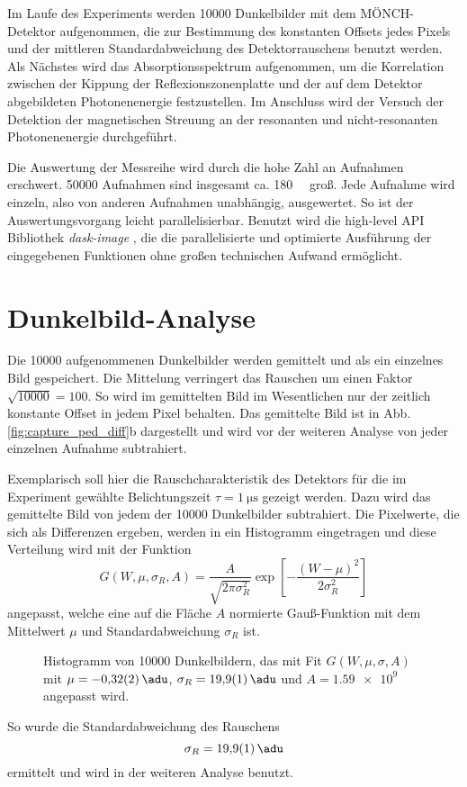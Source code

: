\noindent
Im Laufe des Experiments werden \num{10000} Dunkelbilder mit dem MÖNCH-Detektor aufgenommen, die zur Bestimmung des konstanten Offsets jedes Pixels und der mittleren Standardabweichung des Detektorrauschens benutzt werden. Als Nächstes wird das Absorptionsspektrum aufgenommen, um die Korrelation zwischen der Kippung der Reflexionszonenplatte und der auf dem Detektor abgebildeten Photonenenergie festzustellen. Im Anschluss wird der Versuch der Detektion der magnetischen Streuung an der resonanten und nicht-resonanten Photonenenergie durchgeführt.   

\noindent
Die Auswertung der Messreihe wird durch die hohe Zahl an Aufnahmen erschwert. \num{50000} Aufnahmen sind insgesamt ca. \qty{180}{\giga\byte} groß. Jede Aufnahme wird einzeln, also von anderen Aufnahmen unabhängig, ausgewertet. So ist der Auswertungsvorgang leicht parallelisierbar. Benutzt wird die high-level API Bibliothek \textit{dask-image} \cite{dask-library}, die die parallelisierte und optimierte Ausführung der eingegebenen Funktionen ohne großen technischen Aufwand ermöglicht.

\section{Dunkelbild-Analyse}
Die \num{10000} aufgenommenen Dunkelbilder werden gemittelt und als ein einzelnes Bild gespeichert. Die Mittelung verringert das Rauschen um einen Faktor $\sqrt{10000} = 100$. So wird im gemittelten Bild im Wesentlichen nur der zeitlich konstante Offset in jedem Pixel behalten. Das gemittelte Bild ist in Abb. \ref{fig:capture_ped_diff}b dargestellt und wird vor der weiteren Analyse von jeder einzelnen Aufnahme subtrahiert.

\noindent
Exemplarisch soll hier die Rauschcharakteristik des Detektors für die im Experiment gewählte Belichtungszeit $\tau = \SI{1}{\micro\second}$ gezeigt werden. Dazu wird das gemittelte Bild von jedem der \num{10000} Dunkelbilder subtrahiert. Die Pixelwerte, die sich als Differenzen ergeben, werden in ein Histogramm eingetragen und diese Verteilung wird mit der Funktion
\begin{equation}
    G(W, \mu, \sigma_R, A) = \frac{A}{\sqrt{2\pi \sigma_R^2}}\exp\left[-\frac{(W - \mu)^2}{2\sigma_R^2}\right]
    \label{eq:gauss_funktion}
\end{equation}
angepasst, welche eine auf die Fläche $A$ normierte Gauß-Funktion mit dem Mittelwert $\mu$ und Standardabweichung $\sigma_R$ ist.
\begin{figure}[H]
    \centering
    
    \caption{Histogramm von \num{10000} Dunkelbildern, das mit Fit $G(W,\mu,\sigma, A)$ mit $\mu= \SI{-0.32(2)}{\adu}$, $\sigma_R = \SI{19.9(1)}{\adu}$ und $A = \num{1.59e9}$ angepasst wird.}
    \label{fig:noise_hist_fit}
\end{figure}
\noindent
So wurde die Standardabweichung des Rauschens
\begin{equation}
    \sigma_R = \SI{19.9(1)}{\adu}
    \label{eq:sigma_r}
\end{equation}
ermittelt und wird in der weiteren Analyse benutzt.

